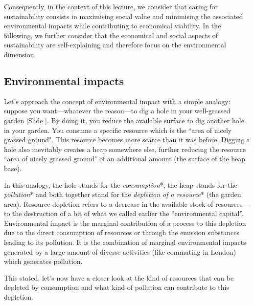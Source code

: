 \documentclass{article}
\newcounter{slide}
\begin{document}
Consequently, in the context of this lecture, we consider that caring for sustainability consists in maximising social value and minimising the associated environmental impacts while contributing to economical viability. In the following, we further consider that the economical and social aspects of sustainability are self-explaining and therefore focus on the environmental dimension.

\subsection{Environmental impacts}
\label{sec:EnvironmentalImpacts}

Let's approach the concept of environmental impact with a simple analogy: suppose you want---whatever the reason---to dig a hole in your well-grassed garden {\color{blue}[Slide ]}. By doing it, you reduce the available surface to dig another hole in your garden. You consume a specific resource which is the ``area of nicely grassed ground". This resource becomes more scarce than it was before. Digging a hole also inevitably creates a heap somewhere else, further reducing the resource ``area of nicely grassed ground" of an additional amount (the surface of the heap base). 

In this analogy, the hole stands for the \emph{consumption}*, the heap stands for the \emph{pollution}* and both together stand for the \emph{depletion of a resource}* (the garden area). Resource depletion refers to a decrease in the available stock of resources---to the destruction of a bit of what we called earlier the ``environmental capital''. Environmental impact is the marginal contribution of a process to this depletion due to the direct consumption of resources or through the emission substances leading to its pollution. It is the combination of marginal environmental impacts generated by a large amount of diverse activities (like commuting in London) which generates pollution. 

This stated, let's now have a closer look at the kind of resources that can be depleted by consumption and what kind of pollution can contribute to this depletion.
\end{document}

